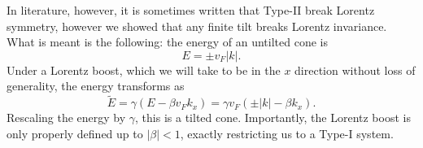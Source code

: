 In literature, however, it is sometimes written that Type-II break Lorentz symmetry,
however we showed that any finite tilt breaks Lorentz invariance.
What is meant is the following:
the energy of an untilted cone is
\[
E = \pm v_F |k|.
\]
Under a Lorentz boost, which we will take to be in the \( x \) direction without loss of generality, the  energy transforms as
\[
\tilde{E} = \gamma (E - \beta v_F k_x) = \gamma v_F (\pm |k| - \beta k_x).
\]
Rescaling the energy by \( \gamma \), this is a tilted cone.
Importantly, the Lorentz boost is only properly defined up to \( |\beta| < 1 \), exactly restricting us to a Type-I system.



